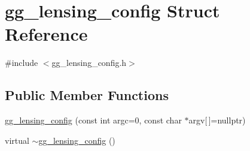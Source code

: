 \hypertarget{structgg__lensing__config}{\section{gg\-\_\-lensing\-\_\-config Struct Reference}
\label{structgg__lensing__config}
}


{\ttfamily \#include $<$gg\-\_\-lensing\-\_\-config.\-h$>$}

\subsection*{Public Member Functions}
\begin{DoxyCompactItemize}
\item 
\hyperlink{structgg__lensing__config_a808f3d67c49d7bbcb6e8345fdf6eecdd}{gg\-\_\-lensing\-\_\-config} (const int argc=0, const char $\ast$argv\mbox{[}$\,$\mbox{]}=nullptr)
\item 
virtual \hyperlink{structgg__lensing__config_aec78098e3fa604b03f785edfb2b5066c}{$\sim$gg\-\_\-lensing\-\_\-config} ()
\end{DoxyCompactItemize}
